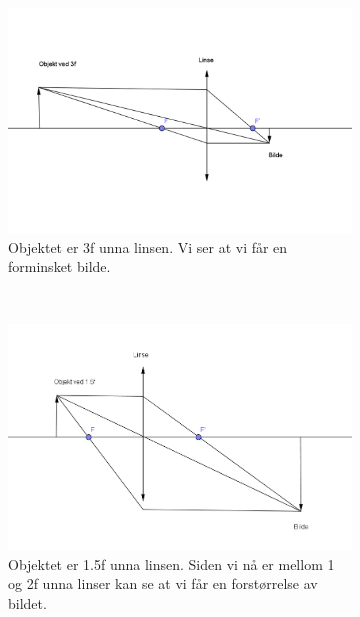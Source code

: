 \documentclass[a4paper,norsk, 10pt]{article}
\begin{document}
\begin{figure}[H]
    \centering

    \begin{subfigure}[b]{0.47\textwidth}
        \includegraphics[width=\textwidth]{3f.png}
        \caption{Objektet er 3f unna linsen. Vi ser at vi får en forminsket bilde.}
        \label{fig:3f}
    \end{subfigure}
    ~ 
    \begin{subfigure}[b]{0.47\textwidth}
        \includegraphics[width=\textwidth]{15f.png}
        \caption{Objektet er 1.5f unna linsen. Siden vi nå er mellom 1 og 2f unna linser kan se at vi får en forstørrelse av bildet.}
        \label{fig:15f}
    \end{subfigure}
    ~ 
    \begin{subfigure}[b]{0.47\textwidth}

\end{subfigure}
\end{figure}
\end{document}
